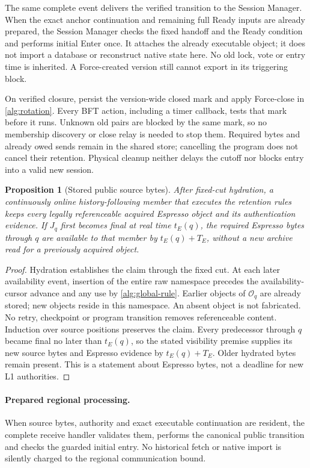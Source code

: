 \documentclass[11pt,a4paper]{article}
\newtheorem{proposition}[proposition]{Proposition}
\begin{document}
The same complete event delivers the verified transition to the Session
Manager. When the exact anchor continuation and remaining full Ready
inputs are already prepared, the Session Manager checks the fixed handoff and
the Ready condition and performs initial Enter once. It
attaches the already executable object; it does not import a database
or reconstruct native state here. No old lock, vote or entry time is
inherited. A Force-created version still cannot export in its triggering
block.

On verified closure, persist the version-wide closed mark and apply
Force-close in \cref{alg:rotation}. Every BFT action, including a timer
callback, tests that mark before it runs. Unknown old pairs are blocked
by the same mark, so no membership discovery or close relay is needed
to stop them. Required bytes and already owed sends remain in the shared
store; cancelling the program does not cancel their retention. Physical
cleanup neither delays the cutoff nor blocks entry into a valid new
session.

\begin{proposition}[Stored public source bytes]
\label{prop:retained-public-bytes}
After fixed-cut hydration, a continuously online history-following
member that executes the retention rules keeps every legally
referenceable acquired Espresso object and its authentication evidence.
If $J_q$ first becomes final at real time $t_E(q)$, the required
Espresso bytes through $q$ are available to that member by $t_E(q)+T_E$, without a
new archive read for a previously acquired object.
\end{proposition}
\begin{proof}
Hydration establishes the claim through the fixed cut. At each later
availability event, insertion of the entire raw namespace precedes the
availability-cursor advance and any use by \cref{alg:global-rule}.
Earlier objects of $\mathcal O_q$ are already stored; new objects reside
in this namespace. An absent
object is not fabricated. No retry, checkpoint or program transition
removes referenceable content. Induction over source positions preserves
the claim. Every predecessor through $q$ became final no later than $t_E(q)$,
so the stated visibility premise supplies its new source bytes and
Espresso evidence by $t_E(q)+T_E$. Older hydrated bytes remain present.
This is a statement about Espresso bytes, not a deadline for new L1 authorities.
\end{proof}

\paragraph{Prepared regional processing.}
\label{sec:source-step-timing}
When source bytes, authority and exact executable continuation are
resident, the complete receive handler validates them, performs the
canonical public transition and checks the guarded initial entry.
No historical fetch or native import is silently charged to the
regional communication bound.
\end{document}
